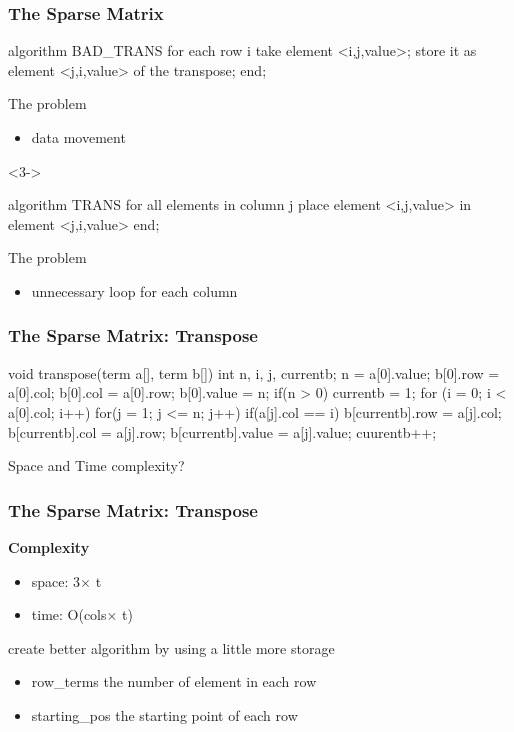 \documentclass[newPxFont,sthlmFooter,nooffset]{beamer}
\begin{document}
\begin{frame}[t, fragile]
  \frametitle{The Sparse Matrix}
\begin{codedef}
algorithm BAD_TRANS 
for each row i
    take element <i,j,value>;
    store it as element <j,i,value> of the transpose; 
end;  
\end{codedef}
The problem
\begin{itemize}
\item <2-> data movement
\end{itemize}
\begin{uncoverenv}<3->
\begin{codedef}
algorithm TRANS
for all elements in column j
    place element <i,j,value> in element <j,i,value> end;
\end{codedef}
The problem
\end{uncoverenv}
\begin{itemize}
\item <4-> unnecessary loop for each column
\end{itemize}
\end{frame}


\begin{frame}[t, fragile]
  \frametitle{The Sparse Matrix: Transpose}
\begin{codedef}
void transpose(term a[], term b[]) {
    int n, i, j, currentb;
    n = a[0].value; 
    b[0].row = a[0].col;
    b[0].col = a[0].row; 
    b[0].value = n;
    if(n > 0){
        currentb = 1;
        for (i = 0; i < a[0].col; i++)
            for(j = 1; j <= n; j++)
                if(a[j].col == i) {
                  b[currentb].row = a[j].col;  
                  b[currentb].col = a[j].row;  
                  b[currentb].value = a[j].value;  
                  cuurentb++;
            }
    }
}
\end{codedef}
Space and Time complexity?
\end{frame}

\begin{frame}[t, fragile]
  \frametitle{The Sparse Matrix: Transpose}
\textbf{Complexity}
\begin{itemize}
\item space: 3$\times$ t
\item time: O(cols$\times$ t)
\end{itemize}

create better algorithm by using a little more storage
\begin{itemize}
\item row\_terms the number of element in each row
\item starting\_pos the starting point of each row
\end{itemize}

\end{frame}
\end{document}
